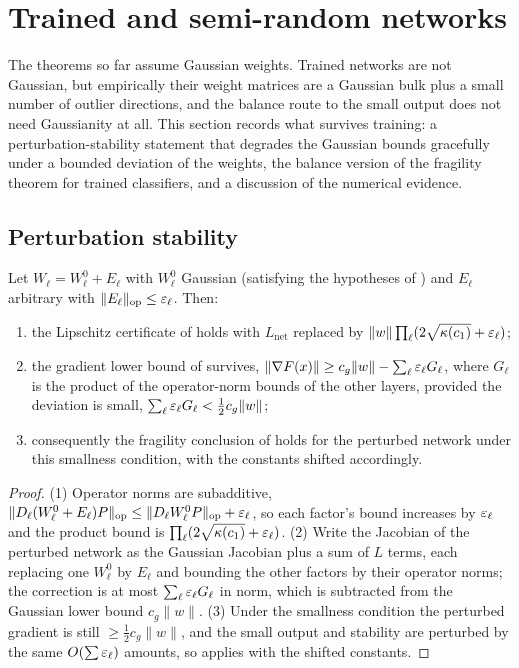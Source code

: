 \section{Trained and semi-random networks}\label{sec:trained}

The theorems so far assume Gaussian weights. Trained networks are not Gaussian, but empirically their
weight matrices are a Gaussian bulk plus a small number of outlier directions, and the balance route to
the small output does not need Gaussianity at all. This section records what survives training: a
perturbation-stability statement that degrades the Gaussian bounds gracefully under a bounded deviation
of the weights, the balance version of the fragility theorem for trained classifiers, and a discussion
of the numerical evidence.

\subsection{Perturbation stability}
\begin{theorem}\label{thm:trained}
Let $W_\ell=W_\ell^0+E_\ell$ with $W_\ell^0$ Gaussian (satisfying the hypotheses of )
and $E_\ell$ arbitrary with $\|E_\ell\|_{\mathrm{op}}\le\varepsilon_\ell$. Then:
\begin{enumerate}
\item the Lipschitz certificate of  holds with $L_{\mathrm{net}}$ replaced by
$\|w\|\prod_\ell(2\sqrt{\kappa(c_1)}+\varepsilon_\ell)$;
\item the gradient lower bound of  survives, $\|\nabla F(x)\|\ge c_g\|w\|-\sum_\ell\varepsilon_\ell G_\ell$,
where $G_\ell$ is the product of the operator-norm bounds of the other layers, provided the deviation
is small, $\sum_\ell\varepsilon_\ell G_\ell<\tfrac12 c_g\|w\|$;
\item consequently the fragility conclusion of  holds for the perturbed network under
this smallness condition, with the constants shifted accordingly.
\end{enumerate}
\end{theorem}

\begin{proof}
(1) Operator norms are subadditive, $\|D_\ell(W_\ell^0+E_\ell)P\|_{\mathrm{op}}\le\|D_\ell W_\ell^0P\|_{\mathrm{op}}+\varepsilon_\ell$,
so each factor's bound increases by $\varepsilon_\ell$ and the product bound is
$\prod_\ell(2\sqrt{\kappa(c_1)}+\varepsilon_\ell)$. (2) Write the Jacobian of the perturbed network as the
Gaussian Jacobian plus a sum of $L$ terms, each replacing one $W_\ell^0$ by $E_\ell$ and bounding the
other factors by their operator norms; the correction is at most $\sum_\ell\varepsilon_\ell G_\ell$ in norm,
which is subtracted from the Gaussian lower bound $c_g\|w\|$. (3) Under the smallness condition the
perturbed gradient is still $\ge\tfrac12c_g\|w\|$, and the small output and stability are perturbed by
the same $O(\sum\varepsilon_\ell)$ amounts, so  applies with the shifted constants.
\end{proof}

